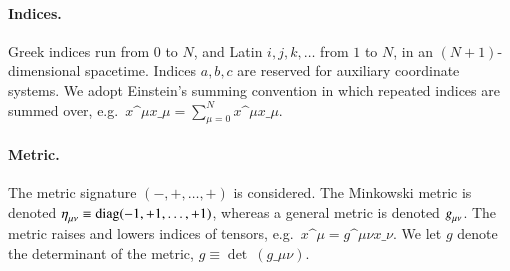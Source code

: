 \paragraph{Indices.} %
Greek indices run from $0$ to $N$, and Latin $i,j,k, \dots$ from $1$ to $N$, in an $(N+1)$-dimensional spacetime. Indices $a,b,c$ are reserved for auxiliary coordinate systems. We adopt Einstein's summing convention in which repeated indices are 
summed over, e.g.~$x\^\mu x\_\mu= \sum_{\mu=0}^N x\^{\mu} x\_{\mu}$.

\paragraph{Metric.} %
The metric signature $(-,+,\dots,+)$ is considered. %
The Minkowski metric is denoted $\eta\indices{_{\mu\nu}}\equiv\text{diag}(-1, +1,\dots,+1)$, 
whereas a general metric is denoted $g\indices{_{\mu\nu}}$. 
The metric raises and lowers indices of tensors, e.g.~$x\^\mu = g\^{\mu\nu}x\_\nu$. We let $g$ denote the determinant of the metric, $g\equiv \det~\!(g\_{\mu\nu})$.






